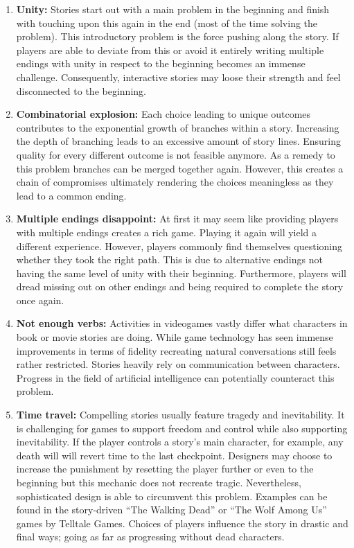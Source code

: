 \begin{enumerate}
    \item \textbf{Unity:} Stories start out with a main problem in the beginning and finish with touching upon this again in the end (most of the time solving the problem). This introductory problem is the force pushing along the story. If players are able to deviate from this or avoid it entirely writing multiple endings with unity in respect to the beginning becomes an immense challenge. Consequently, interactive stories may loose their strength and feel disconnected to the beginning.
    \item \textbf{Combinatorial explosion:} Each choice leading to unique outcomes contributes to the exponential growth of branches within a story. Increasing the depth of branching leads to an excessive amount of story lines. Ensuring quality for every different outcome is not feasible anymore. As a remedy to this problem branches can be merged together again. However, this creates a chain of compromises ultimately rendering the choices meaningless as they lead to a common ending.
    \item \textbf{Multiple endings disappoint:} At first it may seem like providing players with multiple endings creates a rich game. Playing it again will yield a different experience. However, players commonly find themselves questioning whether they took the right path. This is due to alternative endings not having the same level of unity with their beginning. Furthermore, players will dread missing out on other endings and being required to complete the story once again.
    \item \textbf{Not enough verbs:} Activities in videogames vastly differ what characters in book or movie stories are doing. While game technology has seen immense improvements in terms of fidelity recreating natural conversations still feels rather restricted. Stories heavily rely on communication between characters. Progress in the field of artificial intelligence can potentially counteract this problem.
    \item \textbf{Time travel:} Compelling stories usually feature tragedy and inevitability. It is challenging for games to support freedom and control while also supporting inevitability. If the player controls a story's main character, for example, any death will will revert time to the last checkpoint. Designers may choose to increase the punishment by resetting the player further or even to the beginning but this mechanic does not recreate tragic. Nevertheless, sophisticated design is able to circumvent this problem. Examples can be found in the story-driven ``The Walking Dead'' or ``The Wolf Among Us'' games by Telltale Games. Choices of players influence the story in drastic and final ways; going as far as progressing without dead characters.
\end{enumerate}

